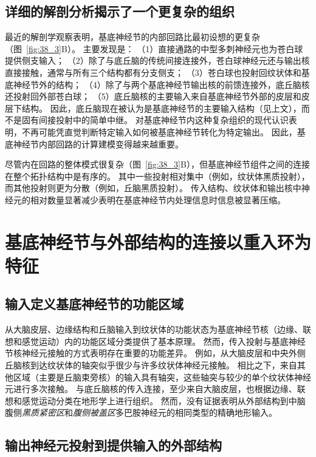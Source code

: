\subsection{详细的解剖分析揭示了一个更复杂的组织}

最近的解剖学观察表明，基底神经节的内部回路比最初设想的更复杂（图~\ref{fig:38_3}B）。
主要发现是：
（1）直接通路的中型多刺神经元也为苍白球提供侧支输入； 
（2）除了与底丘脑的传统间接连接外，苍白球神经元还与输出核直接接触，通常与所有三个结构都有分支侧支；
（3）苍白球也投射回纹状体和基底神经节外的结构；
（4）除了与两个基底神经节输出核的前馈连接外，底丘脑核还投射回外部苍白球； 
（5）底丘脑核的主要输入来自基底神经节外部的皮层和皮层下结构。
因此，底丘脑现在被认为是基底神经节的主要输入结构（见上文），而不是固有间接投射中的简单中继。
对基底神经节内这种复杂组织的现代认识表明，不再可能凭直觉判断特定输入如何被基底神经节转化为特定输出。
因此，基底神经节内部回路的计算建模变得越来越重要。


尽管内在回路的整体模式很复杂（图~\ref{fig:38_3}B），但基底神经节组件之间的连接在整个拓扑结构中是有序的。
其中一些投射相对集中（例如，纹状体黑质投射），而其他投射则更为分散（例如，丘脑黑质投射）。
传入结构、纹状体和输出核中神经元的相对数量显著减少表明在基底神经节内处理信息时信息被显著压缩。



\section{基底神经节与外部结构的连接以重入环为特征}

\subsection{输入定义基底神经节的功能区域}

从大脑皮层、边缘结构和丘脑输入到纹状体的功能状态为基底神经节核（边缘、联想和感觉运动）内的功能区域分类提供了基本原理。
然而，传入投射与基底神经节核神经元接触的方式表明存在重要的功能差异。
例如，从大脑皮层和中央外侧丘脑核到达纹状体的轴突似乎很少与许多纹状体神经元接触。
相比之下，来自其他区域（主要是丘脑束旁核）的输入具有轴突，这些轴突与较少的单个纹状体神经元进行多次接触。
与底丘脑核的传入连接，至少来自大脑皮层，也根据边缘、联想和感觉运动分类在地形学上进行组织。
然而，没有证据表明从外部结构到中脑腹侧\textit{黑质紧密区}和\textit{腹侧被盖区}多巴胺神经元的相同类型的精确地形输入。



\subsection{输出神经元投射到提供输入的外部结构}

